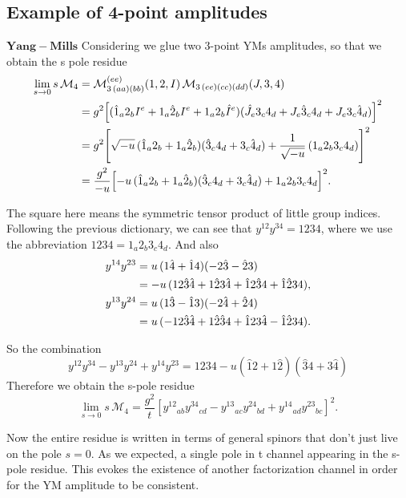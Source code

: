 \documentclass[12pt]{article}
\begin{document}
\subsection{Example of 4-point amplitudes}
$\mathbf{Yang-Mills}$
Considering we glue two 3-point YMs amplitudes, so that we obtain the s pole residue
\begin{align}
\lim_{s \to 0} s\,\mathcal{M}_4
&= \mathcal{M}_{3\,(aa)(bb)}^{(ee)}(1,2,I)\,
   \mathcal{M}_{3\,(ee)(cc)(dd)}(J,3,4) \\
&= g^{2}\Bigl[
   (\hat{1}_a 2_b I^{e} + 1_a \hat{2}_b I^{e} + 1_a 2_b \hat{I}^{e})
   (\hat{J}_e 3_c 4_d + J_e \hat{3}_c 4_d + J_e 3_c \hat{4}_d)
   \Bigr]^{2} \\
&= g^{2}\Biggl[
   \sqrt{-u}\,(\hat{1}_a 2_b + 1_a \hat{2}_b)
   (\hat{3}_c 4_d + 3_c \hat{4}_d)
   + \frac{1}{\sqrt{-u}}\,(1_a 2_b 3_c 4_d)
   \Biggr]^{2} \\
&= \frac{g^{2}}{-u}\Bigl[
   -u\,(\hat{1}_a 2_b + 1_a \hat{2}_b)
   (\hat{3}_c 4_d + 3_c \hat{4}_d)
   + 1_a 2_b 3_c 4_d
   \Bigr]^{2}.
\end{align}

The square here means the symmetric tensor product of little group indices. Following the previous dictionary, we can see that $y^{12}y^{34}=1234$, where we use the abbreviation $1234=1_a2_b3_c4_d$. And also
\begin{align}
y^{14} y^{23}
&= u\,(1\hat{4} + \hat{1}4)(-2\hat{3} - \hat{2}3) \notag\\
&= -u\,(12\hat{3}\hat{4} + 1\hat{2}3\hat{4} + \hat{1}2\hat{3}4 + \hat{1}\hat{2}34), \\
y^{13} y^{24}
&= u\,(1\hat{3} - \hat{1}3)(-2\hat{4} + \hat{2}4) \notag\\
&= u\,(-12\hat{3}\hat{4} + 1\hat{2}\hat{3}4 + \hat{1}23\hat{4} - \hat{1}\hat{2}34).
\end{align}

So the combination 
\begin{equation}
    y^{12} y^{34}-y^{13} y^{24}+y^{14} y^{23}=1234-u(\hat{1}2+1\hat{2})(\hat{3}4+3\hat{4})
\end{equation}
Therefore we obtain the s-pole residue
\begin{equation}
\lim_{s \to 0} s\,\mathcal{M}_4
= \frac{g^{2}}{t}
\left[
y^{12}{}_{ab} y^{34}{}_{cd}
- y^{13}{}_{ac} y^{24}{}_{bd}
+ y^{14}{}_{ad} y^{23}{}_{bc}
\right]^{2}.
\end{equation}

Now the entire residue is written in terms of general spinors that don’t just live on the
pole $s=0$. As we expected, a single pole in t channel appearing in the s-pole residue. This evokes the existence of another
factorization channel in order for the YM amplitude to be consistent.
\end{document}

